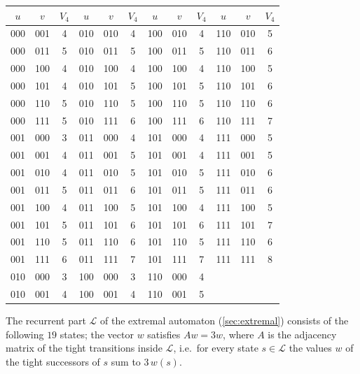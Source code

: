 \documentclass[11pt]{amsart}
\theoremstyle{remark}
\begin{document}
\begin{center}
\small
\begin{tabular}{ccc@{\qquad}ccc@{\qquad}ccc@{\qquad}ccc}
\toprule
$u$ & $v$ & $V_4$ & $u$ & $v$ & $V_4$ & $u$ & $v$ & $V_4$ & $u$ & $v$ & $V_4$\\
\midrule
000 & 001 & 4 & 010 & 010 & 4 & 100 & 010 & 4 & 110 & 010 & 5 \\
000 & 011 & 5 & 010 & 011 & 5 & 100 & 011 & 5 & 110 & 011 & 6 \\
000 & 100 & 4 & 010 & 100 & 4 & 100 & 100 & 4 & 110 & 100 & 5 \\
000 & 101 & 4 & 010 & 101 & 5 & 100 & 101 & 5 & 110 & 101 & 6 \\
000 & 110 & 5 & 010 & 110 & 5 & 100 & 110 & 5 & 110 & 110 & 6 \\
000 & 111 & 5 & 010 & 111 & 6 & 100 & 111 & 6 & 110 & 111 & 7 \\
001 & 000 & 3 & 011 & 000 & 4 & 101 & 000 & 4 & 111 & 000 & 5 \\
001 & 001 & 4 & 011 & 001 & 5 & 101 & 001 & 4 & 111 & 001 & 5 \\
001 & 010 & 4 & 011 & 010 & 5 & 101 & 010 & 5 & 111 & 010 & 6 \\
001 & 011 & 5 & 011 & 011 & 6 & 101 & 011 & 5 & 111 & 011 & 6 \\
001 & 100 & 4 & 011 & 100 & 5 & 101 & 100 & 4 & 111 & 100 & 5 \\
001 & 101 & 5 & 011 & 101 & 6 & 101 & 101 & 6 & 111 & 101 & 7 \\
001 & 110 & 5 & 011 & 110 & 6 & 101 & 110 & 5 & 111 & 110 & 6 \\
001 & 111 & 6 & 011 & 111 & 7 & 101 & 111 & 7 & 111 & 111 & 8 \\
  010 & 000 & 3 & 100 & 000 & 3 & 110 & 000 & 4 &  & &  \\
  010 & 001 & 4 & 100 & 001 & 4 & 110 & 001 & 5 &  & &  \\
\bottomrule
\end{tabular}
\end{center}

The recurrent part $\mathcal L$ of the extremal automaton (\cref{sec:extremal}) consists of the following $19$ states; the vector $w$ satisfies $Aw=3w$, where $A$ is the adjacency matrix of the tight transitions inside $\mathcal L$, i.e.\ for every state $s\in\mathcal L$ the values $w$ of the tight successors of $s$ sum to $3\,w(s)$.
\end{document}

